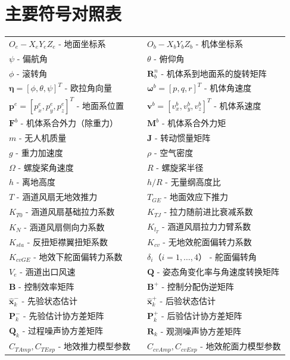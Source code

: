 \chapter{主要符号对照表}
\begin{table}
	\centering{}%
	\begin{tabular}{l>{\centering}p{0.5cm}l}
	 $O_e - X_e Y_e Z_e$ - 地面坐标系 &  & $O_b - X_b Y_b Z_b$ - 机体坐标系\tabularnewline
	 $\psi$ - 偏航角 &  & $\theta$ - 俯仰角\tabularnewline
	 $\phi$ - 滚转角 &  & $\boldsymbol{R}_b^n$ - 机体系到地面系的旋转矩阵\tabularnewline
	 $\boldsymbol{\eta}=[\phi,\theta,\psi]^{T}$ - 欧拉角向量 &  & $\boldsymbol{\omega}^b=[p,q,r]^{T}$ - 机体角速度\tabularnewline
	 $\boldsymbol{p}^e=[p_x^e,p_y^e,p_z^e]^{T}$ - 地面系位置 &  & $\boldsymbol{v}^b=[v_x^b,v_y^b,v_z^b]^{T}$ - 机体系速度\tabularnewline
	 $\boldsymbol{F}^b$ - 机体系合外力（除重力） &  & $\boldsymbol{M}^b$ - 机体系合外力矩\tabularnewline
	 $m$ - 无人机质量 &  & $\boldsymbol{J}$ - 转动惯量矩阵\tabularnewline
	 $g$ - 重力加速度 &  & $\rho$ - 空气密度\tabularnewline
	 $\Omega$ - 螺旋桨角速度 &  & $R$ - 螺旋桨半径\tabularnewline
	 $h$ - 离地高度 &  & $h/R$ - 无量纲高度比\tabularnewline
	 $T$ - 涵道风扇无地效推力 &  & $T_{GE}$ - 地面效应下推力\tabularnewline
	 $K_{T0}$ - 涵道风扇基础拉力系数 &  & $K_{TJ}$ - 拉力随前进比衰减系数\tabularnewline
	 $K_N$ - 涵道风扇侧向力系数 &  & $K_{l_T}$ - 涵道风扇拉力力臂系数\tabularnewline
	 $K_{sta}$ - 反扭矩襟翼扭矩系数 &  & $K_{cv}$ - 无地效舵面偏转力系数\tabularnewline
	 $K_{cvGE}$ - 地效下舵面偏转力系数 &  & $\delta_i$（$i=1,\ldots,4$） - 舵面偏转角\tabularnewline
	 $V_e$ - 涵道出口风速 &  & $\boldsymbol{Q}$ - 姿态角变化率与角速度转换矩阵\tabularnewline
	 $\boldsymbol{B}$ - 控制效率矩阵 &  & $\boldsymbol{B}^+$ - 控制分配伪逆矩阵\tabularnewline
	 $\hat{\boldsymbol{x}}_k^-$ - 先验状态估计 &  & $\hat{\boldsymbol{x}}_k^+$ - 后验状态估计\tabularnewline
	 $\boldsymbol{P}_k^-$ - 先验估计协方差矩阵 &  & $\boldsymbol{P}_k^+$ - 后验估计协方差矩阵\tabularnewline
	 $\boldsymbol{Q}_k$ - 过程噪声协方差矩阵 &  & $\boldsymbol{R}_k$ - 观测噪声协方差矩阵\tabularnewline
	 $C_{TAmp},C_{TExp}$ - 地效推力模型参数 &  & $C_{cvAmp},C_{cvExp}$ - 地效舵面力模型参数\tabularnewline
	\end{tabular}
\end{table}